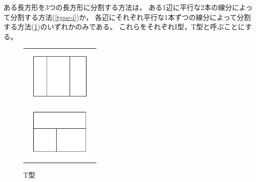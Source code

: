 \documentclass{article}
\begin{document}
ある長方形を3つの長方形に分割する方法は，
ある1辺に平行な2本の線分によって分割する方法(\cref{type-i})か，
各辺にそれぞれ平行な1本ずつの線分によって分割する方法(\cref{type-t})のいずれかのみである。
これらをそれぞれI型，T型と呼ぶことにする。

\begin{figure}[h]
    \begin{center}
        \begin{tabular}{c}
            \begin{minipage}{0.33\hsize}
                \begin{center}
                    \includegraphics[width=100pt]{type-i.png}
                    \caption{I型}
                    \label{type-i}
                \end{center}
            \end{minipage}

            \begin{minipage}{0.33\hsize}
                \begin{center}
                    \includegraphics[width=100pt]{type-t.png}
                    \caption{T型}
                    \label{type-t}
                \end{center}
            \end{minipage}
        \end{tabular}
    \end{center}
\end{figure}
\end{document}
